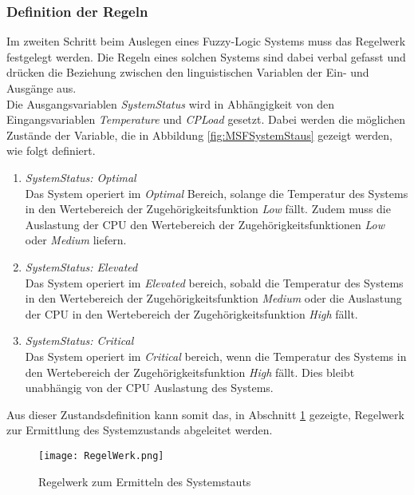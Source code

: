 \subsubsection*{Definition der Regeln}\label{sec:FLRuleBase}
Im zweiten Schritt beim Auslegen eines Fuzzy-Logic Systems muss das Regelwerk festgelegt werden. Die Regeln eines solchen Systems sind dabei verbal gefasst und drücken die Beziehung zwischen den linguistischen Variablen der Ein- und Ausgänge aus.\cite{FLRegelwerk} \\
Die Ausgangsvariablen \textit{SystemStatus} wird in Abhängigkeit von den Eingangsvariablen \textit{Temperature} und \textit{CPLoad} gesetzt. Dabei werden die möglichen Zustände der Variable, die in Abbildung \ref{fig:MSFSystemStaus} gezeigt werden, wie folgt definiert. 
\begin{enumerate}
    \item \textit{SystemStatus: Optimal}\\
    Das System operiert im \textit{Optimal} Bereich, solange die Temperatur des Systems in den Wertebereich der Zugehörigkeitsfunktion \textit{Low} fällt. Zudem muss die Auslastung der CPU den Wertebereich der Zugehörigkeitsfunktionen \textit{Low} oder \textit{Medium} liefern.  
    \item \textit{SystemStatus: Elevated}\\
    Das System operiert im \textit{Elevated} bereich, sobald die Temperatur des Systems in den Wertebereich der Zugehörigkeitsfunktion \textit{Medium} oder die Auslastung der CPU in den Wertebereich der Zugehörigkeitsfunktion \textit{High} fällt.
    \item \textit{SystemStatus: Critical}\\
    Das System operiert im \textit{Critical} bereich, wenn die Temperatur des Systems in den Wertebereich der Zugehörigkeitsfunktion \textit{High} fällt. Dies bleibt unabhängig von der CPU Auslastung des Systems. 
\end{enumerate}
Aus dieser Zustandsdefinition kann somit das, in Abschnitt \ref{fig:FuzzyLogicRuleBase} gezeigte, Regelwerk zur Ermittlung des Systemzustands abgeleitet werden.  
\begin{center}
    \begin{figure}[h!]
        \captionsetup{justification=centering,format=plain, font=small}
        \centering
        \texttt{[image: RegelWerk.png]}
        \caption{Regelwerk zum Ermitteln des Systemstauts}
        \label{fig:FuzzyLogicRuleBase}
    \end{figure}
\end{center}
\vspace{-0.5cm}  

